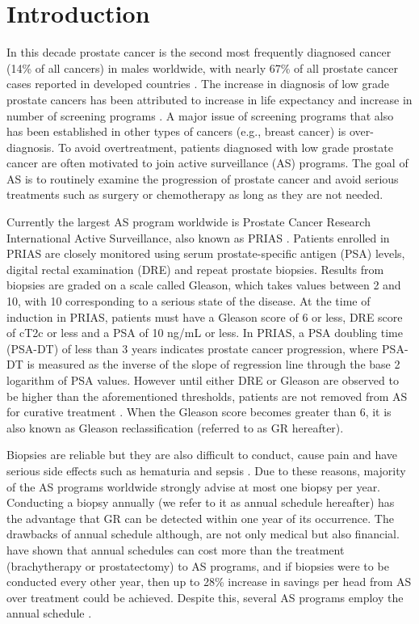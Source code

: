 \section{Introduction}
\label{sec : introduction}
In this decade prostate cancer is the second most frequently diagnosed cancer (14\% of all cancers) in males worldwide, with nearly 67\% of all prostate cancer cases reported in developed countries \citep{GlobalCancerStats2012}. The increase in diagnosis of low grade prostate cancers has been attributed to increase in life expectancy and increase in number of screening programs \citep{potoskyPSAcancer}. A major issue of screening programs that also has been established in other types of cancers (e.g., breast cancer) is over-diagnosis. To avoid overtreatment, patients diagnosed with low grade prostate cancer are often motivated to join active surveillance (AS) programs. The goal of AS is to routinely examine the progression of prostate cancer and avoid serious treatments such as surgery or chemotherapy as long as they are not needed.

Currently the largest AS program worldwide is Prostate Cancer Research International Active Surveillance, also known as PRIAS \citep{bokhorst2016decade}. Patients enrolled in PRIAS are closely monitored using serum prostate-specific antigen (PSA) levels, digital rectal examination (DRE) and repeat prostate biopsies. Results from biopsies are graded on a scale called Gleason, which takes values between 2 and 10, with 10 corresponding to a serious state of the disease. At the time of induction in PRIAS, patients must have a Gleason score of 6 or less, DRE score of cT2c or less and a PSA of 10 ng/mL or less. In PRIAS, a PSA doubling time (PSA-DT) of less than 3 years indicates prostate cancer progression, where PSA-DT is measured as the inverse of the slope of regression line through the base 2 logarithm of PSA values. However until either DRE or Gleason are observed to be higher than the aforementioned thresholds, patients are not removed from AS for curative treatment \citep{bokhorst2016decade}. When the Gleason score becomes greater than 6, it is also known as Gleason reclassification (referred to as GR hereafter).

Biopsies are reliable but they are also difficult to conduct, cause pain and have serious side effects such as hematuria and sepsis \citep{loeb2013systematic}. Due to these reasons, majority of the AS programs worldwide strongly advise at most one biopsy per year. Conducting a biopsy annually (we refer to it as annual schedule hereafter) has the advantage that GR can be detected within one year of its occurrence. The drawbacks of annual schedule although, are not only medical but also financial. \citet{keegan2012active} have shown that annual schedules can cost more than the treatment (brachytherapy or prostatectomy) to AS programs, and if biopsies were to be conducted every other year, then up to 28\% increase in savings per head from AS over treatment could be achieved. Despite this, several AS programs employ the annual schedule \citep{tosoian2011active,welty2015extended}.

